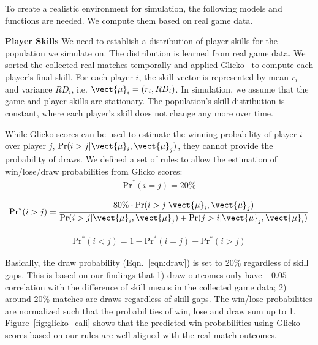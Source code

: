To create a realistic environment for simulation, the following models and functions are needed. We compute them based on real game data.

\textbf{Player Skills} We need to establish a distribution of player skills for the population we simulate on. The distribution is learned from real game data. We sorted the collected real matches temporally and applied Glicko~\cite{glickman1999parameter} to compute each player's final skill. For each player $i$, the skill vector is represented by mean $r_i$ and variance $RD_i$, i.e. $\vect{\mu}_i = (r_i, RD_i)$. In simulation, we assume that the game and player skills are stationary. The population's skill distribution is constant, where each player's skill does not change any more over time.


While Glicko scores can be used to estimate the winning probability of player $i$ over player $j$, $\Pr(i > j | \vect{\mu}_i, \vect{\mu}_j)$, they cannot provide the probability of draws. We defined a set of rules to allow the estimation of win/lose/draw probabilities from Glicko scores:
\begin{align}\label{eqn:draw}
\text{Pr}^*(i=j) = 20\%
\end{align}

\begin{align}
\text{Pr}^*(i>j)  = \frac{80\% \cdot \Pr(i > j | \vect{\mu}_i, \vect{\mu}_j)}{\Pr(i > j | \vect{\mu}_i, \vect{\mu}_j) + \Pr(j > i | \vect{\mu}_j, \vect{\mu}_i) }
\end{align}

\begin{align}
\text{Pr}^*(i<j) = 1 - \text{Pr}^*(i=j) - \text{Pr}^*(i>j)
\end{align}

Basically, the draw probability (Eqn.~\ref{eqn:draw}) is set to $20\%$ regardless of skill gaps. This is based on our findings that 1) draw outcomes only have $-0.05$ correlation with the difference of skill means in the collected game data; 2) around $20\%$ matches are draws regardless of skill gaps. The win/lose probabilities are normalized such that the probabilities of win, lose and draw sum up to 1. Figure~\ref{fig:glicko_cali} shows that the predicted win probabilities using Glicko scores based on our rules are well aligned with the real match outcomes.

